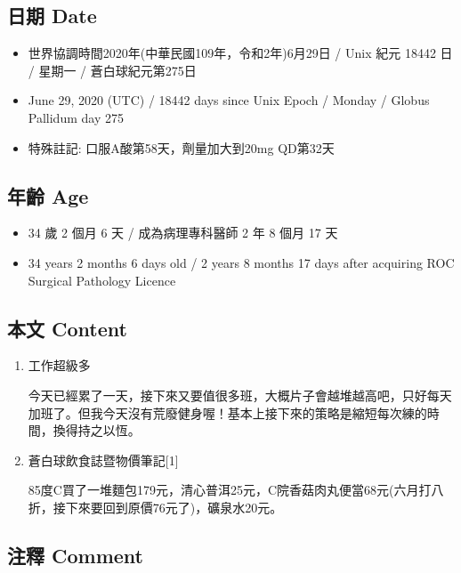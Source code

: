 \documentclass[
]{article}
\providecommand{\tightlist}{%
  \setlength{\itemsep}{0pt}\setlength{\parskip}{0pt}}
\begin{document}
\hypertarget{ux65e5ux671f-date-24}{%
\subsection{日期 Date}\label{ux65e5ux671f-date-24}}

\begin{itemize}
\tightlist
\item
  世界協調時間2020年(中華民國109年，令和2年)6月29日 / Unix 紀元 18442 日
  / 星期一 / 蒼白球紀元第275日
\item
  June 29, 2020 (UTC) / 18442 days since Unix Epoch / Monday / Globus
  Pallidum day 275
\item
  特殊註記: 口服A酸第58天，劑量加大到20mg QD第32天
\end{itemize}

\hypertarget{ux5e74ux9f61-age-24}{%
\subsection{年齡 Age}\label{ux5e74ux9f61-age-24}}

\begin{itemize}
\tightlist
\item
  34 歲 2 個月 6 天 / 成為病理專科醫師 2 年 8 個月 17 天
\item
  34 years 2 months 6 days old / 2 years 8 months 17 days after
  acquiring ROC Surgical Pathology Licence
\end{itemize}

\hypertarget{ux672cux6587-content-24}{%
\subsection{本文 Content}\label{ux672cux6587-content-24}}

\begin{enumerate}
\def\labelenumi{\arabic{enumi}.}
\item
  工作超級多

  今天已經累了一天，接下來又要值很多班，大概片子會越堆越高吧，只好每天加班了。但我今天沒有荒廢健身喔！基本上接下來的策略是縮短每次練的時間，換得持之以恆。
\item
  蒼白球飲食誌暨物價筆記{[}1{]}

  85度C買了一堆麵包179元，清心普洱25元，C院香菇肉丸便當68元(六月打八折，接下來要回到原價76元了)，礦泉水20元。
\end{enumerate}

\hypertarget{ux6ce8ux91cb-comment-24}{%
\subsection{注釋 Comment}\label{ux6ce8ux91cb-comment-24}}
\end{document}
